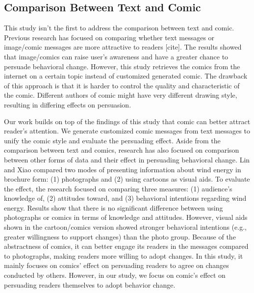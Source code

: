 \subsection{Comparison Between Text and Comic
}
This study isn't the first to address the comparison between text and comic. Previous research has focused on comparing whether text messages or image/comic messages are more attractive to readers [cite]. The results showed that image/comics can raise user's awareness and have a greater chance to persuade behavioral change. However, this study retrieves the comics from the internet on a certain topic instead of customized generated comic. The drawback of this approach is that it is harder to control the quality and characteristic of the comic. Different authors of comic might have very different drawing style, resulting in differing effects on persuasion.\par
Our work builds on top of the findings of this study that comic can better attract reader's attention. We generate customized comic messages from text messages to unify the comic style and evaluate the persuading effect. Aside from the comparison between text and comics, research has also focused on comparison between other forms of data and their effect in persuading behavioral change. Lin and Xiao compared two modes of presenting information about wind energy in brochure form: (1) photographs and (2) using cartoons as visual aids. To evaluate the effect, the research focused on comparing three measures: (1) audience's knowledge of, (2) attitudes toward, and (3) behavioral intentions regarding wind energy. Results show that there is no significant difference between using photographs or comics in terms of knowledge and attitudes. However, visual aids shown in the cartoon/comics version showed stronger behavioral intentions (e.g., greater willingness to support changes) than the photo group. Because of the abstractness of comics, it can better engage its readers in the messages compared to photographs, making readers more willing to adopt changes. In this study, it mainly focuses on comics' effect on persuading readers to agree on changes conducted by others. However, in our study, we focus on comic's effect on persuading readers themselves to adopt behavior change.\par

